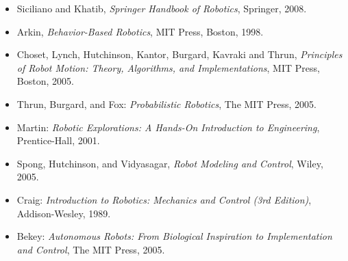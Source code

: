 \begin{itemize}
\item Siciliano and Khatib, \emph{Springer Handbook of Robotics}, Springer, 2008.
\item Arkin, \emph{Behavior-Based Robotics}, MIT Press, Boston, 1998.
\item Choset, Lynch, Hutchinson, Kantor, Burgard, Kavraki and Thrun, \emph{Principles of Robot Motion: Theory, Algorithms, and Implementations}, MIT Press, Boston, 2005.
\item Thrun, Burgard, and Fox: \emph{Probabilistic Robotics}, The MIT Press, 2005.
\item Martin: \emph{Robotic Explorations: A Hands-On Introduction to Engineering}, Prentice-Hall, 2001.
\item Spong, Hutchinson, and Vidyasagar, \emph{Robot Modeling and Control}, Wiley, 2005.
\item Craig: \emph{Introduction to Robotics: Mechanics and Control (3rd Edition)}, Addison-Wesley, 1989.
\item Bekey: \emph{Autonomous Robots: From Biological Inspiration to Implementation and Control}, The MIT Press, 2005.
\end{itemize}

\newpage
